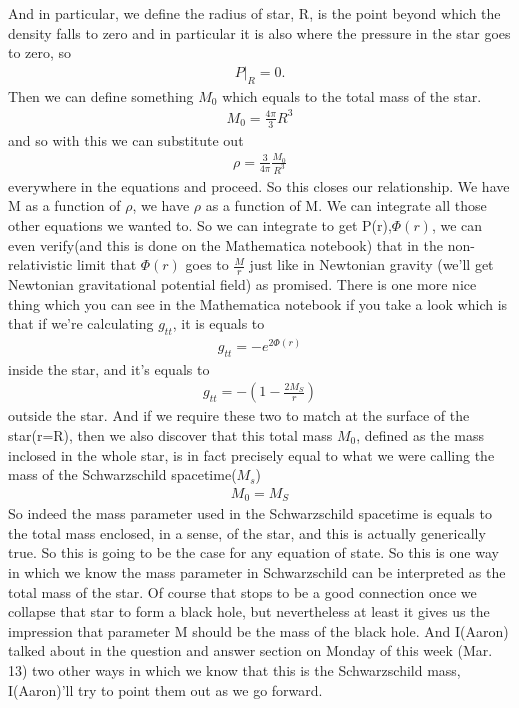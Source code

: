 \documentclass[10pt]{article}
\begin{document}
And in particular, we define the radius of star, R, is the point beyond which the density falls to zero and in particular it is also where the pressure in the star goes to zero, so 
\begin{align}P\Bigr\rvert_{R}=0.\end{align}
Then we can define something $M_0$ which equals to the total mass of the star.
\begin{align}M_0=\frac{4\pi}{3}R^3\end{align}
and so with this we can substitute out 
\begin{align}\rho=\frac{3}{4\pi} \frac{M_0}{R^3}\end{align} everywhere in the equations and proceed. 
\newline\newline So this closes our relationship. We have M as a function of $\rho$, we have $\rho$ as a function of M.
We can integrate all those other equations we wanted to. So we can integrate to get P(r),$\Phi(r)$, we can even verify(and this is done on the Mathematica notebook) that in the non-relativistic limit that $\Phi(r)$ goes to $\frac{M}{r}$ just like in Newtonian gravity (we'll get Newtonian gravitational potential field) as promised.\newline\newline
There is one more nice thing which you can see in the Mathematica notebook if you take a look which is that if we're calculating $g_{tt}$, it is equals to 
\begin{align}g_{tt}=-e^{2\Phi(r)}\end{align} inside the star, and it's equals to 
\begin{align}g_{tt}=-(1-\frac{2M_S}{r}) \end{align}   outside the star.
And if we require these two to match at the surface of the star(r=R), then we also discover that this total mass $M_0$, defined as the mass inclosed in the whole star, is in fact precisely equal to what we were calling the mass of the Schwarzschild spacetime($M_s$)
\begin{align}M_0=M_S\end{align}
So indeed the mass parameter used in the Schwarzschild spacetime is equals to the total mass enclosed, in a sense, of the star, and this is actually generically true. So this is going to be the case for any equation of state. So this is one way in which we know the mass parameter in Schwarzschild can be interpreted as the total mass of the star. Of course that stops to be a good connection once we collapse that star to form a black hole, but nevertheless at least it gives us the impression that parameter M should be the mass of the black hole. And I(Aaron) talked about in the question and answer section on Monday of this week (Mar. 13) two other ways in which we know that this is the Schwarzschild mass, I(Aaron)'ll try to point them out as we go forward.
\end{document}
